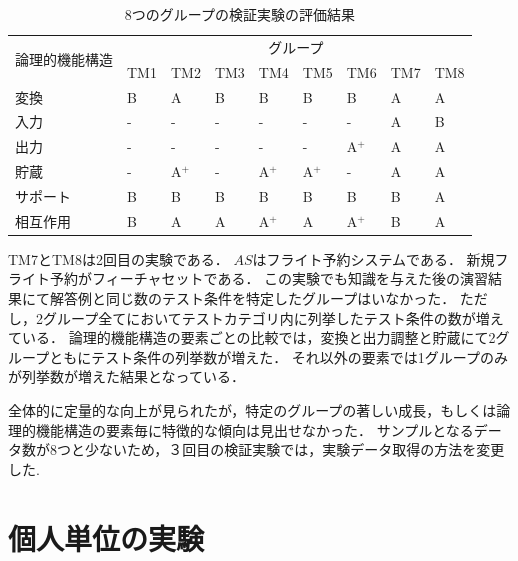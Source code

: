 \begin{table}[htbp]
\footnotesize
  \centering
  \caption{8つのグループの検証実験の評価結果}
    \begin{tabular}{|l|l|l|l|l|l|l|l|l|}
    \hline
    \multicolumn{1}{|c|}{\multirow{2}[4]{*}{論理的機能構造}} & \multicolumn{8}{c|}{グループ} \bigstrut\\
\cline{2-9}          & TM1   & TM2   & TM3   & TM4   & TM5   & TM6 & TM7 & TM8 \bigstrut\\
    \hline
    変換  & B     & A     & B     & B     & B     & B & A     & A\bigstrut\\
    \hline
    入力 &  -     &   -     &   -    &   -    &   -    & -     & A     & B   \bigstrut\\
    \hline
    出力 & -     & -     & -     & -     & -     & A${}^\text{+}$ & A     & A \bigstrut\\
    \hline
    貯蔵 & -     & A${}^\text{+}$    & -     & A${}^\text{+}$    & A${}^\text{+}$    & -& A     & A  \bigstrut\\
    \hline
    サポート & B     & B     & B     & B     & B     & B& B     & A \bigstrut[t]\\
    \hline
    相互作用  & B     & A     & A     & A${}^\text{+}$    & A     & A${}^\text{+}$& B     & A \bigstrut[b]\\
    \hline
    \end{tabular}%
  \label{tab:D-3-tab5}%
\end{table}%

TM7とTM8は2回目の実験である．
$AS$はフライト予約システムである．
新規フライト予約がフィーチャセットである．
この実験でも知識を与えた後の演習結果にて解答例と同じ数のテスト条件を特定したグループはいなかった．
ただし，2グループ全てにおいてテストカテゴリ内に列挙したテスト条件の数が増えている．
論理的機能構造の要素ごとの比較では，変換と出力調整と貯蔵にて2グループともにテスト条件の列挙数が増えた．
それ以外の要素では1グループのみが列挙数が増えた結果となっている．

全体的に定量的な向上が見られたが，特定のグループの著しい成長，もしくは論理的機能構造の要素毎に特徴的な傾向は見出せなかった．
サンプルとなるデータ数が8つと少ないため，３回目の検証実験では，実験データ取得の方法を変更した.

\newpage
\section{個人単位の実験}
